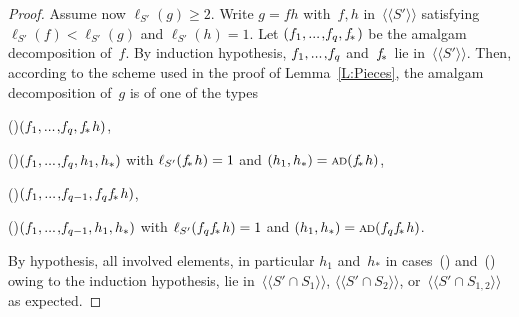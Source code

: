 \documentclass{amsart}
\numberwithin{equation}{section}
\theoremstyle{plain}
\theoremstyle{definition}
\let\ge=\geqslant
\newcounter{ITEM}
\begin{document}
\begin{proof}
Assume now ${\ell_{{{S}'}}({g})} \ge 2$. Write ${g} = {f} {h}$ with~${f}, {h}$ in~${\langle\!\langle{{{S}'}}\rangle\!\rangle}$ satisfying ${\ell_{{{S}'}}({f})} < {\ell_{{{S}'}}({g})}$ and ${\ell_{{{S}'}}({h})} = 1$. Let $({f}_1 {, ...\hspace{0.2ex},} {f}_{q}, {{f}_{\hspace{-0.3ex}*\hspace{0.2ex}}})$ be the amalgam decomposition of~${f}$. By induction hypothesis, ${f}_1 {, ...\hspace{0.2ex},} {f}_{q}$ and~${{f}_{\hspace{-0.3ex}*\hspace{0.2ex}}}$ lie in~${\langle\!\langle{{{S}'}}\rangle\!\rangle}$.
Then, according to the scheme used in the proof of Lemma~\ref{L:Pieces}, the amalgam decomposition of~${g}$ is of one of the types

{\setcounter{ITEM}{1}\leavevmode\hbox{\rm()}}\quad $({f}_1 {, ...\hspace{0.2ex},} {f}_{q}, {{f}_{\hspace{-0.3ex}*\hspace{0.2ex}}} {h})$,

{\setcounter{ITEM}{2}\leavevmode\hbox{\rm()}}\quad $({f}_1 {, ...\hspace{0.2ex},} {f}_{q}, {h}_1, {h}_*)$ \quad with ${\ell_{{{S}'}}({{{f}_{\hspace{-0.3ex}*\hspace{0.2ex}}} {h}})} = 1$ and $({h}_1, {h}_*) = {{\scriptstyle\mathrm{A\hspace{-0.1ex}D}}({{{f}_{\hspace{-0.3ex}*\hspace{0.2ex}}} {h}})}$,

{\setcounter{ITEM}{3}\leavevmode\hbox{\rm()}}\quad $({f}_1 {, ...\hspace{0.2ex},} {f}_{{q}-1}, {f}_{q} {{f}_{\hspace{-0.3ex}*\hspace{0.2ex}}} {h})$, 

{\setcounter{ITEM}{4}\leavevmode\hbox{\rm()}}\quad $({f}_1 {, ...\hspace{0.2ex},} {f}_{{q}-1}, {h}_1, {h}_*)$ \quad with ${\ell_{{{S}'}}({{f}_{q} {{f}_{\hspace{-0.3ex}*\hspace{0.2ex}}} {h}})} = 1$ and $({h}_1, {h}_*) = {{\scriptstyle\mathrm{A\hspace{-0.1ex}D}}({{f}_{q} {{f}_{\hspace{-0.3ex}*\hspace{0.2ex}}} {h}})}$.

\noindent By hypothesis, all involved elements, in particular ${h}_1$ and~${h}_*$ in cases~{\setcounter{ITEM}{2}\leavevmode\hbox{\rm()}} and~{\setcounter{ITEM}{4}\leavevmode\hbox{\rm()}} owing to the induction hypothesis, lie in~${\langle\!\langle{{{S}' \cap {S}_1}}\rangle\!\rangle}$, ${\langle\!\langle{{{S}' \cap {S}_2}}\rangle\!\rangle}$, or~${\langle\!\langle{{{S}' \cap {S}_{1,2}}}\rangle\!\rangle}$ as expected.
\end{proof}
\end{document}
